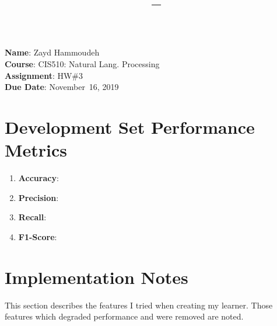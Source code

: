 \documentclass{article}
\title{\textbf{\course\ -- \assnName}}
\author{\name}
\newcommand{\name}{Zayd Hammoudeh}
\newcommand{\course}{CIS510: Natural Lang. Processing}
\newcommand{\assnName}{HW\#3}
\newcommand{\dueDate}{November~16, 2019}
\begin{document}
  \maketitle

  \noindent
  \textbf{Name}: \name\\
  \textbf{Course}: \course\\
  \textbf{Assignment}: \assnName\\
  \textbf{Due Date}: \dueDate


  \section{Development Set Performance Metrics}

  \begin{enumerate}
    \item \textbf{Accuracy}: 
    \item \textbf{Precision}: 
    \item \textbf{Recall}: 
    \item \textbf{F1-Score}: 
  \end{enumerate}

  \section{Implementation Notes}

  This section describes the features I tried when creating my learner.  Those features which degraded performance and were removed are noted.
\end{document}
